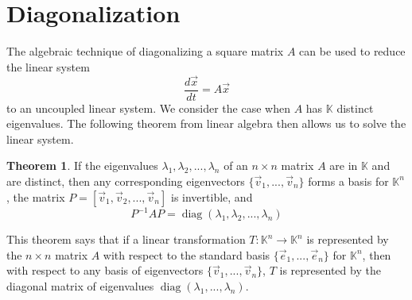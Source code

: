 \documentclass[11pt]{book}
\theoremstyle{definition}\newtheorem{definition}[subsection]{Definition}
\theoremstyle{definition}\newtheorem{example}[subsection]{Example}
\theoremstyle{definition}\newtheorem{notation}[subsection]{Notation}
\theoremstyle{definition}\newtheorem{remark}[subsection]{Remark}
\theoremstyle{theorem}\newtheorem{theorem}[subsection]{Theorem}
\theoremstyle{theorem}\newtheorem{lemma}[subsection]{Lemma}
\theoremstyle{theorem}\newtheorem{proposition}[subsection]{Proposition}
\theoremstyle{theorem}\newtheorem{corollary}[subsection]{Corollary}
\theoremstyle{theorem}\newtheorem{case}{Case}
\theoremstyle{remark}\newtheorem{subcase}{Subcase}[case]
\newcommand{\K}{\mathbb{K}}
\DeclareMathOperator{\diag}{diag}
\begin{document}
\section{Diagonalization}

The algebraic technique of diagonalizing a square matrix $A$ can be used to reduce the linear system 
\begin{equation*}
    \frac{d\vec{x}}{dt} = A\vec{x} \tag{1}
\end{equation*}
to an uncoupled linear system. We consider the case when $A$ has $\K$ distinct eigenvalues. The following theorem from linear algebra then allows us to solve the linear system.

\begin{theorem}\label{theorem:1.3.1}
    If the eigenvalues $\lambda_1, \lambda_2,..., \lambda_n$ of an $n \times n$ matrix $A$ are in $\K$ and are distinct, then any corresponding eigenvectors $\{\vec{v}_1,..., \vec{v}_n\}$ forms a basis for $\K^n$, the matrix $P = [\vec{v}_1, \vec{v}_2,..., \vec{v}_n]$ is invertible, and 
    \begin{equation*}
        P^{-1}AP = \diag(\lambda_1, \lambda_2,..., \lambda_n)
    \end{equation*}
\end{theorem}

This theorem says that if a linear transformation $T : \K^n \to \K^n$ is represented by the $n \times n$ matrix $A$ with respect to the standard basis $\{\vec{e}_1,..., \vec{e}_n\}$ for $\K^n$, then with respect to any basis of eigenvectors $\{\vec{v}_1,..., \vec{v}_n\}$, $T$ is represented by the diagonal matrix of eigenvalues $\diag(\lambda_1,..., \lambda_n)$.
\end{document}
